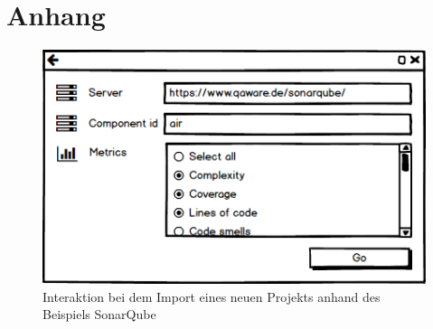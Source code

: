 \chapter{Anhang}

\begin{figure}[htb]
  \includegraphics[width=.8\textwidth]{figures/sonarqube-import}
  \caption{Interaktion bei dem Import eines neuen Projekts anhand des Beispiels SonarQube}
  \label{fig:sonarqube-import}
\end{figure}